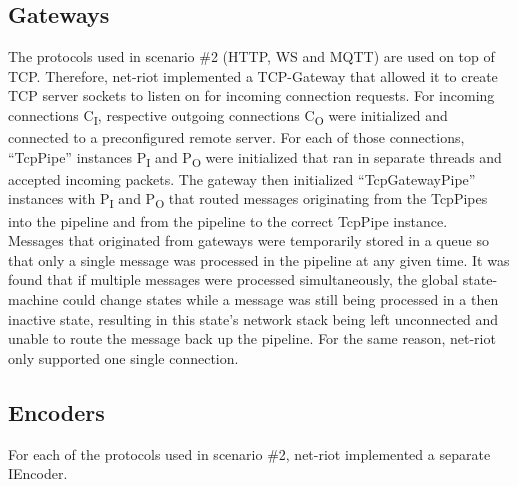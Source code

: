 \subsection{Gateways}
The protocols used in scenario \#2 (\ac{HTTP}, \ac{WS} and \ac{MQTT}) are used on top of \ac{TCP}. Therefore, net-riot implemented a \ac{TCP}-Gateway that allowed it to create \ac{TCP} server sockets to listen on for incoming connection requests. For incoming connections C\textsubscript{I}, respective outgoing connections C\textsubscript{O} were initialized and connected to a preconfigured remote server. For each of those connections, \enquote{TcpPipe} instances P\textsubscript{I} and P\textsubscript{O} were initialized that ran in separate threads and accepted incoming packets. The gateway then initialized \enquote{TcpGatewayPipe} instances with P\textsubscript{I} and P\textsubscript{O} that routed messages originating from the TcpPipes into the pipeline and from the pipeline to the correct TcpPipe instance.\\
Messages that originated from gateways were temporarily stored in a queue so that only a single message was processed in the pipeline at any given time. It was found that if multiple messages were processed simultaneously, the global state-machine could change states while a message was still being processed in a then inactive state, resulting in this state's network stack being left unconnected and unable to route the message back up the pipeline. For the same reason, net-riot only supported one single connection.  


\subsection{Encoders}
For each of the protocols used in scenario \#2, net-riot implemented a separate IEncoder.
